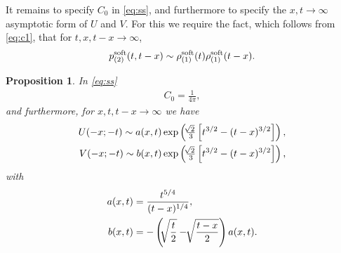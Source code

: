 \documentclass[10pt,reqno]{amsart}
\theoremstyle{plain}
\newtheorem{proposition}{Proposition}
\theoremstyle{definition}
\theoremstyle{remark}
\begin{document}
It remains to specify $C_0$ in \eqref{eq:ss}, and furthermore to specify the $x,t \rightarrow \infty$ asymptotic form 
of $U$ and $V$. For this we require the fact, which follows from \eqref{eq:c1}, that for $t,x,t-x \rightarrow \infty$,
\begin{align}
p_{(2)}^{{\rm soft}}(t,t-x) \sim \rho_{(1)}^{{\rm soft}}(t) \rho_{(1)}^{{\rm soft}}(t-x).    
\label{eq:p1p}
\end{align}

\begin{proposition} \label{prop:final_edit_prop}
In \eqref{eq:ss}
\begin{align}
C_0 = \frac{1}{4\pi} ,     
\label{eq:ca1}
\end{align}
and furthermore, for $x,t, t-x \rightarrow \infty $ we have
\begin{align}
U(-x;-t) \sim a(x,t) \exp \left( \tfrac{{ \hspace{-0.5pt} \sqrt[]{{2}}}}{3}\left[t^{3/2} - (t-x)^{3/2} \right] \right) , 
\label{eq:ca2} \\
V(-x;-t) \sim b(x,t) \exp \left( \tfrac{{ \hspace{-0.5pt} \sqrt[]{{2}}}}{3}\left[t^{3/2} - (t-x)^{3/2} \right] \right) , 
\label{eq:ca3}
\end{align}
with
\begin{align}
a(x,t) &= \frac{t^{5/4}}{(t-x)^{1/4}} ,
\label{eq:ca4}  \\
b(x,t) &= - \left( { \hspace{-0.5pt} \sqrt[]{{\frac{t}{2}}}}  - { \hspace{-0.5pt} \sqrt[]{{\frac{t-x}{2}}}} \right) a(x,t) .
\label{eq:ca5}
\end{align}
\end{proposition}
\end{document}
